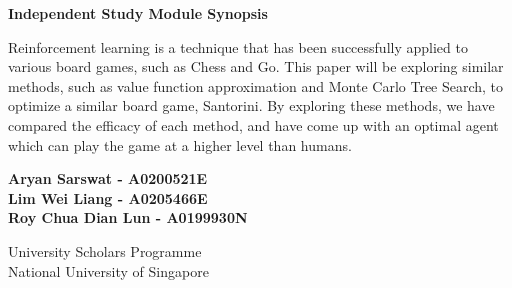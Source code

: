 \documentclass[a4paper,12pt,table]{article}
\begin{document}
    
\begin{titlepage}
    \begin{center} 
        \textbf{{\Huge Independent Study Module Synopsis}}
    \vspace{3cm}
    
    \end{center}
  \Large Reinforcement learning is a technique that has been successfully applied to various board games, such as Chess and Go. This paper will be exploring similar methods, such as value function approximation and Monte Carlo Tree Search, to optimize a similar board game, Santorini. By exploring these methods, we have compared the efficacy of each method, and have come up with an optimal agent which can play the game at a higher level than humans.  \par
 
        \vspace{0.5cm}
 
        \vspace{1.5cm}
 
 
        \vfill
 
 
        \begin{center}
            \textbf{Aryan Sarswat -  A0200521E \\
            Lim Wei Liang - A0205466E \\
            Roy Chua Dian Lun - A0199930N \\ }
    
           \vspace{0.8cm}
    
          University Scholars Programme\\
           National University of Singapore\\
        \end{center}
 \end{titlepage}
\end{document}
